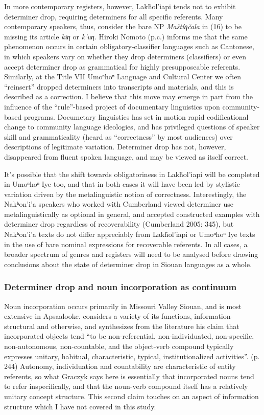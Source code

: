 \documentclass[output=paper]{LSP/langsci}
\begin{document}
In more contemporary registers, however, Lakȟol’iapi tends not to exhibit determiner drop, requiring determiners for all specific referents. Many contemporary speakers, thus, consider the bare NP \emph{Maštíƞčala} in (16) to be missing its article \emph{kiƞ} or \emph{k’uƞ}. Hiroki Nomoto (p.c.) informs me that the same phenomenon occurs in certain obligatory-classifier languages such as Cantonese, in which speakers vary on whether they drop determiners (classifiers) or even accept determiner drop as grammatical for highly presupposeable referents. Similarly, at the Title VII Umoⁿhoⁿ Language and Cultural Center we often “reinsert” dropped determiners into transcripts and materials, and this is described as a correction. I believe that this move may emerge in part from the influence of the “rule”-based project of documentary linguistics upon community-based programs. Documetary linguistics has set in motion rapid codificational change to community language ideologies, and has privileged questions of speaker skill and grammaticality (heard as “correctness” by most audiences) over descriptions of legitimate variation. Determiner drop has not, however, disappeared from fluent spoken language, and may be viewed as itself correct.

	It’s possible that the shift towards obligatoriness in Lakȟol’iapi will be completed in Umoⁿhoⁿ Iye too, and that in both cases it will have been led by stylistic variation driven by the metalinguistic notion of correctness. Interestingly, the Nakʰon’i’a speakers who worked with Cumberland viewed determiner use metalinguistically as optional in general, and accepted constructed examples with determiner drop regardless of recoverability (Cumberland 2005: 345), but Nakʰon’i’a texts do not differ appreciably from Lakȟol’iapi or Umoⁿhoⁿ Iye texts in the use of bare nominal expressions for recoverable referents. In all cases, a broader spectrum of genres and registers will need to be analysed before drawing conclusions about the state of determiner drop in Siouan languages as a whole.

\subsubsection{Determiner drop and noun incorporation as continuum}\label{dropincorp}

Noun incorporation occurs primarily in Missouri Valley Siouan, and is most extensive in Apsaalooke. \citet{Graczyk1991} considers a variety of its functions, information-structural and otherwise, and synthesizes from the literature his claim that incorporated objects tend “to be non-referential, non-individuated, non-specific, non-autonomous, non-countable, and the object-verb compound typically expresses unitary, habitual, characteristic, typical, institutionalized activities”. (p. 244) Autonomy, individuation and countability are characteristic of entity referents, so what Graczyk says here is essentially that incorporated nouns tend to refer inspecifically, and that the noun-verb compound itself has a relatively unitary concept structure. This second claim touches on an aspect of information structure which I have not covered in this study.
\end{document}

